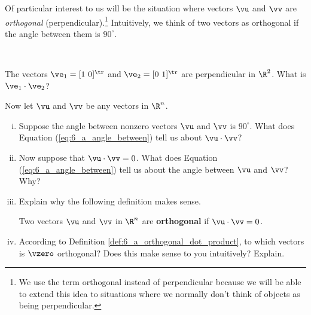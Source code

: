 Of particular interest to us will be the situation where vectors $\vu$ and $\vv$ are \emph{orthogonal} (perpendicular).\footnote{We use the term orthogonal instead of perpendicular because we will be able to extend this idea to situations where we normally don't think of objects as being perpendicular.} Intuitively, we think of two vectors as orthogonal if the angle between them is $90^{\circ}$. 



\begin{activity} \label{act:6_a_orthogonality} ~ 
	\ba
	\item The vectors $\ve_1 = [ 1 \ 0]^{\tr}$ and $\ve_2 = [0 \ 1]^{\tr}$ are perpendicular in $\R^2$. What is $\ve_1 \cdot \ve_2$?
	
	
	
	\item Now let $\vu$ and $\vv$ be any vectors in $\R^n$. 
		\begin{enumerate}[i.]
		\item Suppose the angle between nonzero vectors $\vu$ and $\vv$ is $90^{\circ}$. What does Equation (\ref{eq:6_a_angle_between}) tell us about $\vu \cdot \vv$?
		
		
		
		\item Now suppose that $\vu \cdot \vv = 0$. What does Equation (\ref{eq:6_a_angle_between}) tell us about the angle between $\vu$ and $\vv$? Why?
		
		
		
		\item Explain why the following definition makes sense.


		
\begin{definition} \label{def:6_a_orthogonal_dot_product} Two vectors $\vu$ and $\vv$ in $\R^n$ are \textbf{orthogonal} if $\vu \cdot \vv = 0$.
\end{definition}



	\item According to Definition \ref{def:6_a_orthogonal_dot_product}, to which vectors is $\vzero$ orthogonal? Does this make sense to you intuitively? Explain. 
	
	
	
	\end{enumerate}
	
\ea

\end{activity}


